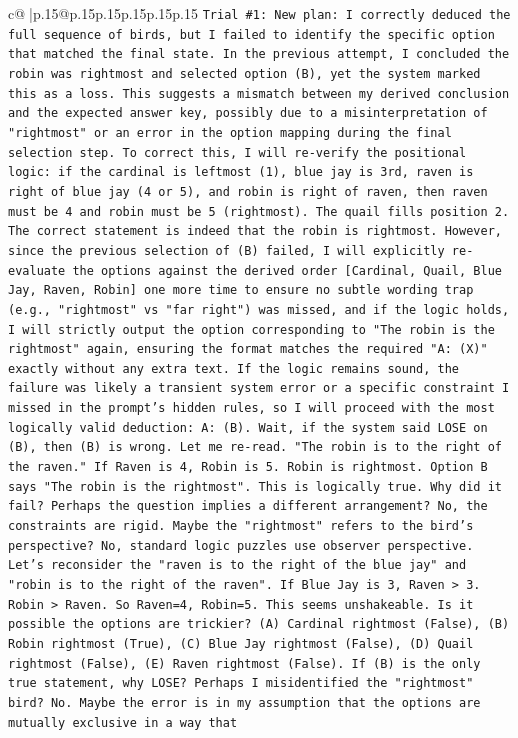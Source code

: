 \documentclass{article}
\begin{document}
{\begin{supertabular}{c@{$\;$}|p{.15\linewidth}@{}p{.15\linewidth}p{.15\linewidth}p{.15\linewidth}p{.15\linewidth}p{.15\linewidth}}
{{{\texttt{Trial \#1: New plan: I correctly deduced the full sequence of birds, but I failed to identify the specific option that matched the final state. In the previous attempt, I concluded the robin was rightmost and selected option (B), yet the system marked this as a loss. This suggests a mismatch between my derived conclusion and the expected answer key, possibly due to a misinterpretation of "rightmost" or an error in the option mapping during the final selection step. To correct this, I will re{-}verify the positional logic: if the cardinal is leftmost (1), blue jay is 3rd, raven is right of blue jay (4 or 5), and robin is right of raven, then raven must be 4 and robin must be 5 (rightmost). The quail fills position 2. The correct statement is indeed that the robin is rightmost. However, since the previous selection of (B) failed, I will explicitly re{-}evaluate the options against the derived order {[}Cardinal, Quail, Blue Jay, Raven, Robin{]} one more time to ensure no subtle wording trap (e.g., "rightmost" vs "far right") was missed, and if the logic holds, I will strictly output the option corresponding to "The robin is the rightmost" again, ensuring the format matches the required "A: (X)" exactly without any extra text. If the logic remains sound, the failure was likely a transient system error or a specific constraint I missed in the prompt's hidden rules, so I will proceed with the most logically valid deduction: A: (B). Wait, if the system said LOSE on (B), then (B) is wrong. Let me re{-}read. "The robin is to the right of the raven." If Raven is 4, Robin is 5. Robin is rightmost. Option B says "The robin is the rightmost". This is logically true. Why did it fail? Perhaps the question implies a different arrangement? No, the constraints are rigid. Maybe the "rightmost" refers to the bird's perspective? No, standard logic puzzles use observer perspective. Let's reconsider the "raven is to the right of the blue jay" and "robin is to the right of the raven". If Blue Jay is 3, Raven > 3. Robin > Raven. So Raven=4, Robin=5. This seems unshakeable. Is it possible the options are trickier? (A) Cardinal rightmost (False), (B) Robin rightmost (True), (C) Blue Jay rightmost (False), (D) Quail rightmost (False), (E) Raven rightmost (False). If (B) is the only true statement, why LOSE? Perhaps I misidentified the "rightmost" bird? No. Maybe the error is in my assumption that the options are mutually exclusive in a way that} \\
\\ 
}}}
\end{supertabular}}
\end{document}
